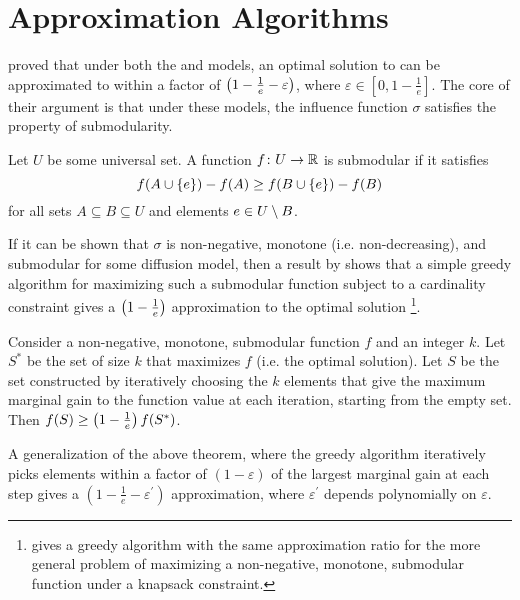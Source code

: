 \section{Approximation Algorithms}
\label{sec:approx_algs}
\citet{kempe2003maximizing} proved that under both the \ltmodel{} and \icmodel{} models, an optimal solution to \infmax{} can be approximated
to within a factor of $\left( 1 - \frac{1}{e} - \varepsilon \right)$, where $\varepsilon \in [0, 1 - \frac{1}{e}]$. The core of their argument is that
under these models, the influence function $\sigma$ satisfies the property of submodularity. 

\begin{definition}[Submodularity]
    Let $U$ be some universal set. A function $f\colon U \to \mathbb{R}$ is submodular if it satisfies 
    \begin{equation}
        f \! \left( A \cup \left\{ e \right\} \right) - f \! \left( A \right) \geq  f \! \left( B \cup \left\{ e \right\} \right) - f \! \left( B \right)
        \label{eq:submod}
    \end{equation} 
    for all sets $A \subseteq B \subseteq U$ and elements $e \in U \setminus B$.
    \label{def:submod} 
\end{definition}
 
If it can be shown that $\sigma$ is non-negative, monotone (i.e.\! non-decreasing), and submodular for some diffusion model, then a result by \citet{nemhauser1978analysis} shows that a simple greedy algorithm for maximizing such a submodular function subject to a cardinality constraint gives a $\left( 1 - \frac{1}{e} \right)$ approximation 
to the optimal solution \footnote{\cite{sviridenko2004note} gives a greedy algorithm with the same approximation ratio for the more general problem of maximizing a non-negative, monotone, submodular function under a knapsack constraint.}. 

\begin{theorem}
    Consider a non-negative, monotone, submodular function $f$ and an integer $k$. Let $S^*$ be the set of size $k$ that maximizes $f$ (i.e.\! the optimal solution). 
    Let $S$ be the set constructed by iteratively choosing the $k$ elements that give the maximum marginal gain to the function value at each iteration, starting from the empty set. Then $f \! \left( S \right) \geq \left( 1 - \frac{1}{e} \right)f \! \left( S^* \right)$. 
    \label{thm:submod_cardin}
\end{theorem}

A generalization of the above theorem, where the greedy algorithm iteratively picks elements within a factor of 
$(1-\varepsilon)$ of the largest marginal gain at each step gives a $(1 - \frac{1}{e} - \varepsilon^\prime)$ approximation, 
where $\varepsilon^\prime$ depends polynomially on $\varepsilon$. 

